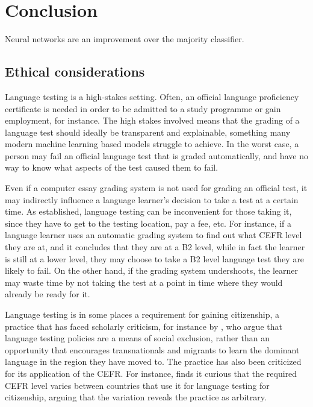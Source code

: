 \chapter{Conclusion}

Neural networks are an improvement over the majority classifier.


\section{Ethical considerations}

Language testing is a high-stakes setting. Often, an official language
proficiency certificate is needed in order to be admitted to a study
programme or gain employment, for instance. The high stakes involved means
that the grading of a language test should ideally be transparent and
explainable, something many modern machine learning based models struggle to
achieve. In the worst case, a person may fail an official language test that
is graded automatically, and have no way to know what aspects of the test
caused them to fail.

Even if a computer essay grading system is not used for grading an official
test, it may indirectly influence a language learner's decision to take a
test at a certain time. As established, language testing can be inconvenient
for those taking it, since they have to get to the testing location, pay a
fee, etc. For instance, if a language learner uses an automatic grading
system to find out what CEFR level they are at, and it concludes that they
are at a B2 level, while in fact the learner is still at a lower level, they
may choose to take a B2 level language test they are likely to fail. On the
other hand, if the grading system undershoots, the learner may waste time by
not taking the test at a point in time where they would already be ready for
it.

Language testing is in some places a requirement for gaining citizenship, a
practice that has faced scholarly criticism, for instance by
\textcite[162]{weberhorner}, who argue that language testing policies are a
means of social exclusion, rather than an opportunity that encourages
transnationals and migrants to learn the dominant language in the region they
have moved to. The practice has also been criticized for its application of
the \ac{CEFR}. For instance, \textcite{van2009fortress} finds it curious that
the required CEFR level varies between countries that use it for language
testing for citizenship, arguing that the variation reveals the practice as
arbitrary.

